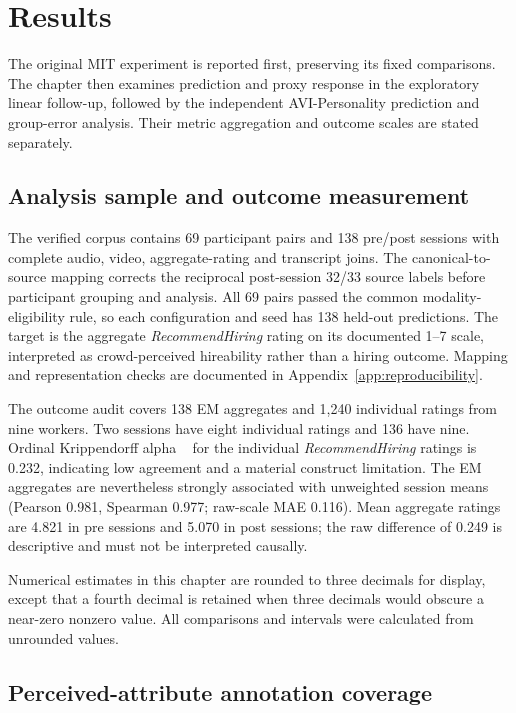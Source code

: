 \chapter{Results}
\label{ch:results}

The original MIT experiment is reported first, preserving its fixed comparisons. The chapter
then examines prediction and proxy response in the exploratory linear follow-up, followed by
the independent AVI-Personality prediction and group-error analysis. Their metric aggregation
and outcome scales are stated separately.

\section{Analysis sample and outcome measurement}

The verified corpus contains 69 participant pairs and 138 pre/post sessions with complete
audio, video, aggregate-rating and transcript joins. The canonical-to-source mapping corrects
the reciprocal post-session 32/33 source labels before participant grouping and analysis. All
69 pairs passed the common modality-eligibility rule, so each configuration and seed has 138
held-out predictions. The target is the aggregate \emph{RecommendHiring} rating on its documented
1--7 scale, interpreted as crowd-perceived hireability rather than a hiring outcome. Mapping and
representation checks are documented in Appendix~\ref{app:reproducibility}.

The outcome audit covers 138 EM aggregates and 1,240 individual ratings from nine workers. Two
sessions have eight individual ratings and 136 have nine. Ordinal Krippendorff alpha
~\cite{Krippendorff2011} for the individual \emph{RecommendHiring} ratings is 0.232, indicating
low agreement and a material construct limitation. The EM aggregates are nevertheless strongly
associated with unweighted session means (Pearson 0.981, Spearman 0.977; raw-scale MAE
0.116). Mean aggregate ratings are 4.821 in pre sessions and 5.070 in post sessions;
the raw difference of 0.249 is descriptive and must not be interpreted causally.

Numerical estimates in this chapter are rounded to three decimals for display, except that a
fourth decimal is retained when three decimals would obscure a near-zero nonzero value. All
comparisons and intervals were calculated from unrounded values.

\section{Perceived-attribute annotation coverage}

